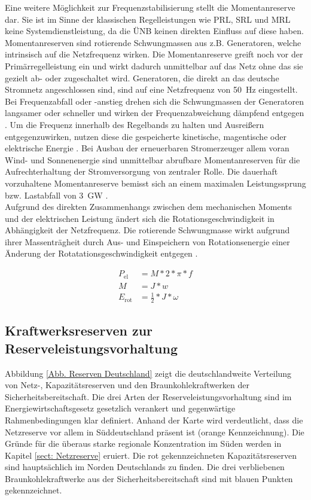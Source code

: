 			Eine weitere Möglichkeit zur Frequenzstabilisierung stellt die Momentanreserve dar.
			Sie ist im Sinne der klassischen Regelleistungen wie PRL, SRL und MRL keine Systemdienstleistung, da die ÜNB keinen direkten Einfluss auf diese haben.
			Momentanreserven sind rotierende Schwungmassen aus z.B. Generatoren, welche intrinsisch auf die Netzfrequenz wirken.
			Die Momentanreserve greift noch vor der Primärregelleistung ein und wirkt dadurch unmittelbar auf das Netz ohne das sie gezielt ab- oder zugeschaltet wird.
			Generatoren, die direkt an das deutsche Stromnetz angeschlossen sind, sind auf eine Netzfrequenz von \SI{50}{\hertz} eingestellt.
			Bei Frequenzabfall oder -anstieg drehen sich die Schwungmassen der Generatoren langsamer oder schneller und wirken der Frequenzabweichung dämpfend entgegen \cite{Gawlik}.		
			Um die Frequenz innerhalb des Regelbands zu halten und Ausreißern entgegenzuwirken, nutzen diese die gespeicherte kinetische, magentische oder elektrische Energie \cite{Energiespeicher}.
			Bei Ausbau der erneuerbaren Stromerzeuger allem voran Wind- und Sonnenenergie sind unmittelbar abrufbare Momentanreserven für die Aufrechterhaltung der Stromversorgung von zentraler Rolle.
			Die dauerhaft vorzuhaltene Momentanreserve bemisst sich an einem maximalen Leistungssprung bzw. Lastabfall von \SI{3}{\giga\watt} \cite{Bericht_Momentanreserve}. \\
			
			Aufgrund des direkten Zusammenhangs zwischen dem mechanischen Moments und der elektrischen Leistung ändert sich die Rotationsgeschwindigkeit in Abhängigkeit der Netzfrequenz.
			Die rotierende Schwungmasse wirkt aufgrund ihrer Massenträgheit durch Aus- und Einspeichern von Rotationsenergie einer Änderung der Rotatationsgeschwindigkeit entgegen \cite{Bericht_Momentanreserve}.
			
			\begin{align}
				P_\mathrm{el}&=M*\num{2}*\pi*f \\
				M&=J*w \\
				E_\mathrm{rot}&=\frac{\num{1}}{\num{2}}*J*\omega
			\end{align}
		
	\subsection{Kraftwerksreserven zur Reserveleistungsvorhaltung}
	
		Abbildung \ref{Abb. Reserven Deutschland} zeigt die deutschlandweite Verteilung von Netz-, Kapazitätsreserven und den Braunkohlekraftwerken der Sicherheitsbereitschaft.
		Die drei Arten der Reserveleistungsvorhaltung sind im Energiewirtschaftsgesetz gesetzlich verankert und gegenwärtige Rahmenbedingungen klar definiert.
		Anhand der Karte wird verdeutlicht, dass die Netzreserve vor allem in Süddeutschland präsent ist (orange Kennzeichnung).
		Die Gründe für die überaus starke regionale Konzentration im Süden werden in Kapitel \ref{sect: Netzreserve} eruiert.
		Die rot gekennzeichneten Kapazitätsreserven sind hauptsächlich im Norden Deutschlands zu finden.
		Die drei verbliebenen Braunkohlekraftwerke aus der Sicherheitsbereitschaft sind mit blauen Punkten gekennzeichnet.
		

